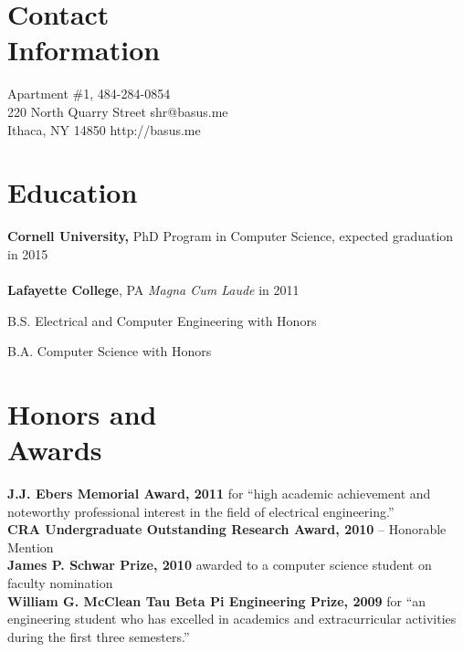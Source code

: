 \documentclass[margin,line]{resume}
\begin{document}

\begin{resume}


    \section{Contact\\Information}

    Apartment \#1,                          \hfill 484-284-0854          \\
    220 North Quarry Street                 \hfill shr@basus.me          \\
    Ithaca, NY 14850                        \hfill http://basus.me

    \section{Education}

    {\bf Cornell University,} PhD Program in Computer Science,
    expected graduation in 2015 \\
    \\
    {\bf Lafayette College}, PA \emph{Magna Cum Laude} in 2011%
    \begin{list2}
        \item B.S. Electrical and Computer Engineering with Honors
        \item B.A. Computer Science with Honors
    \end{list2}
    \section{Honors and\\Awards}

    {\bf J.J. Ebers Memorial Award, 2011} for ``high academic achievement and
    noteworthy professional interest in the field of electrical engineering.''\\
    {\bf CRA Undergraduate Outstanding Research Award, 2010} -- Honorable
    Mention \\
    {\bf James P. Schwar Prize, 2010} awarded to a computer science student on
    faculty nomination \\
    {\bf William G. McClean Tau Beta Pi Engineering Prize, 2009} for ``an
    engineering student who has excelled in academics and extracurricular
    activities during the first three semesters.''


\end{resume}
\end{document}
